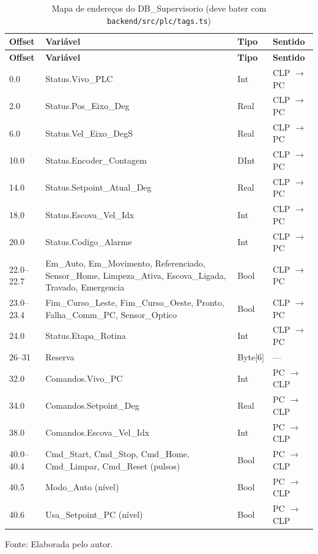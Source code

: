 \documentclass[12pt, oneside, a4paper, chapter=TITLE, section=TITLE, english, brazil]{abntex2}
\begin{document}
\begin{longtable}{p{}p{}p{}p{}}
\caption[Mapa de endereços do DB\_Supervisorio]{Mapa de endereços do DB\_Supervisorio (deve bater com \texttt{backend/src/plc/tags.ts})}
\label{tab:offsets} \\
\toprule
\textbf{Offset} & \textbf{Variável} & \textbf{Tipo} & \textbf{Sentido} \\
\midrule
\endfirsthead
\toprule
\textbf{Offset} & \textbf{Variável} & \textbf{Tipo} & \textbf{Sentido} \\
\midrule
\endhead
0.0 & Status.Vivo\_PLC & Int & CLP $\rightarrow$ PC \\
2.0 & Status.Pos\_Eixo\_Deg & Real & CLP $\rightarrow$ PC \\
6.0 & Status.Vel\_Eixo\_DegS & Real & CLP $\rightarrow$ PC \\
10.0 & Status.Encoder\_Contagem & DInt & CLP $\rightarrow$ PC \\
14.0 & Status.Setpoint\_Atual\_Deg & Real & CLP $\rightarrow$ PC \\
18.0 & Status.Escova\_Vel\_Idx & Int & CLP $\rightarrow$ PC \\
20.0 & Status.Codigo\_Alarme & Int & CLP $\rightarrow$ PC \\
22.0--22.7 & Em\_Auto, Em\_Movimento, Referenciado, Sensor\_Home, Limpeza\_Ativa, Escova\_Ligada, Travado, Emergencia & Bool & CLP $\rightarrow$ PC \\
23.0--23.4 & Fim\_Curso\_Leste, Fim\_Curso\_Oeste, Pronto, Falha\_Comm\_PC, Sensor\_Optico & Bool & CLP $\rightarrow$ PC \\
24.0 & Status.Etapa\_Rotina & Int & CLP $\rightarrow$ PC \\
26--31 & Reserva & Byte[6] & --- \\
32.0 & Comandos.Vivo\_PC & Int & PC $\rightarrow$ CLP \\
34.0 & Comandos.Setpoint\_Deg & Real & PC $\rightarrow$ CLP \\
38.0 & Comandos.Escova\_Vel\_Idx & Int & PC $\rightarrow$ CLP \\
40.0--40.4 & Cmd\_Start, Cmd\_Stop, Cmd\_Home, Cmd\_Limpar, Cmd\_Reset (pulsos) & Bool & PC $\rightarrow$ CLP \\
40.5 & Modo\_Auto (nível) & Bool & PC $\rightarrow$ CLP \\
40.6 & Usa\_Setpoint\_PC (nível) & Bool & PC $\rightarrow$ CLP \\
\bottomrule
\end{longtable}
\vspace{-0.6cm}
\begin{center}\small Fonte: Elaborada pelo autor.\end{center}
\end{document}
